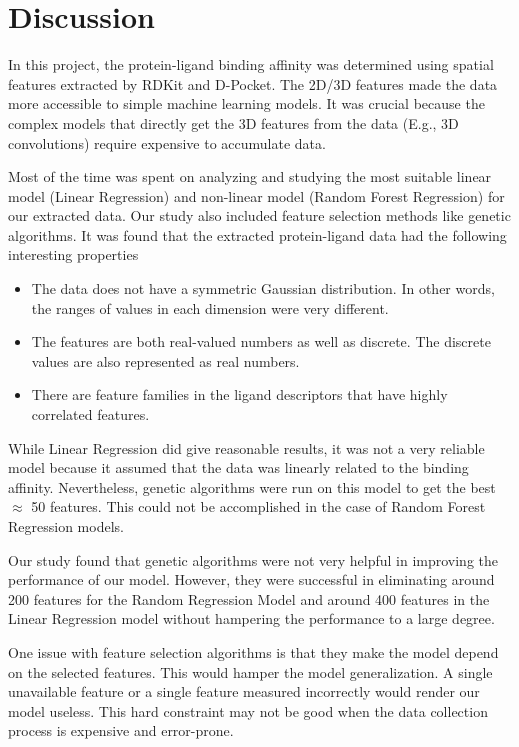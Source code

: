 \documentclass[11pt]{article}
\begin{document}
\section{Discussion}
In this project, the protein-ligand binding affinity was determined using spatial features extracted by RDKit and D-Pocket.
The 2D/3D features made the data more accessible to simple machine learning models. 
It was crucial because the complex models that directly get the 3D features from the data (E.g., 3D convolutions) require expensive to accumulate data.

Most of the time was spent on analyzing and studying the most suitable linear model (Linear Regression) and non-linear model (Random Forest Regression) for our extracted data.
Our study also included feature selection methods like genetic algorithms.
It was found that the extracted protein-ligand data had the following interesting properties
\begin{itemize}
\item The data does not have a symmetric Gaussian distribution.  In other words, the ranges of values in each dimension were very different.
\item The features are both real-valued numbers as well as discrete.  The discrete values are also represented as real numbers.
\item There are feature families in the ligand descriptors that have highly correlated features.
\end{itemize}

While Linear Regression did give reasonable results,  it was not a very reliable model because it assumed that the data was linearly related to the binding affinity.
Nevertheless,  genetic algorithms were run on this model to get the best $\approx$ 50 features.
This could not be accomplished in the case of Random Forest Regression models.

Our study found that genetic algorithms were not very helpful in improving the performance of our model. However, they were successful in eliminating around 200 features for the Random Regression Model and around 400 features in the Linear Regression model without hampering the performance to a large degree.

One issue with feature selection algorithms is that they make the model depend on the selected features.
This would hamper the model generalization.
A single unavailable feature or a single feature measured incorrectly would render our model useless.
This hard constraint may not be good when the data collection process is expensive and error-prone.
\end{document}
